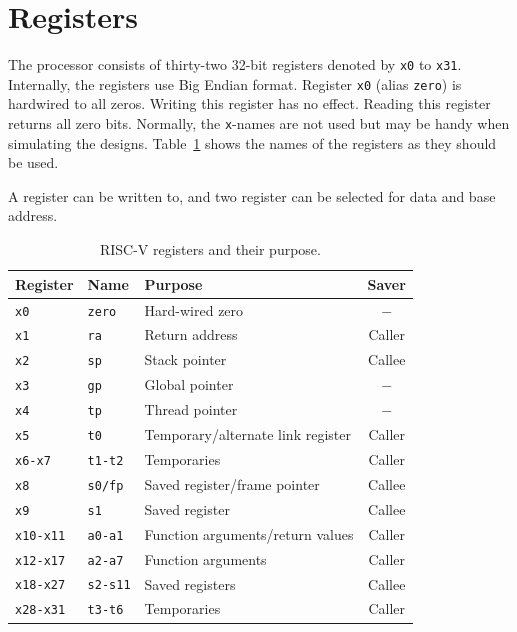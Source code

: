 \documentclass[12pt]{article}
\begin{document}
\section{Registers}
The processor consists of thirty-two 32-bit registers denoted by \texttt{x0} to \texttt{x31}. Internally, the registers use Big Endian format. Register \texttt{x0} (alias \texttt{zero}) is hardwired to all zeros. Writing this register has no effect. Reading this register returns all zero bits. Normally, the \texttt{x}-names are not used but may be handy when simulating the designs. Table~\ref{tab:registers} shows the names of the registers as they should be used.

A register can be written to, and two register can be selected for data and base address.

\begin{table}[!ht]
\centering
\caption{RISC-V registers and their purpose.}
\label{tab:registers}
\begin{tabular}{lllc}
Register & Name & Purpose & Saver \\
\midrule
\texttt{x0}      & \texttt{zero}   & Hard-wired zero                   & $-$ \\
\texttt{x1}      & \texttt{ra}     & Return address                    & Caller \\
\texttt{x2}      & \texttt{sp}     & Stack pointer                     & Callee \\
\texttt{x3}      & \texttt{gp}     & Global pointer                    & $-$ \\
\texttt{x4}      & \texttt{tp}     & Thread pointer                    & $-$ \\
\texttt{x5}      & \texttt{t0}     & Temporary/alternate link register & Caller \\
\texttt{x6-x7}   & \texttt{t1-t2}  & Temporaries                       & Caller \\
\texttt{x8}      & \texttt{s0/fp}  & Saved register/frame pointer      & Callee \\
\texttt{x9}      & \texttt{s1}     & Saved register                    & Callee \\
\texttt{x10-x11} & \texttt{a0-a1}  & Function arguments/return values  & Caller \\
\texttt{x12-x17} & \texttt{a2-a7}  & Function arguments                & Caller \\
\texttt{x18-x27} & \texttt{s2-s11} & Saved registers                   & Callee \\
\texttt{x28-x31} & \texttt{t3-t6}  & Temporaries                       & Caller
\end{tabular}
\end{table}
\end{document}
